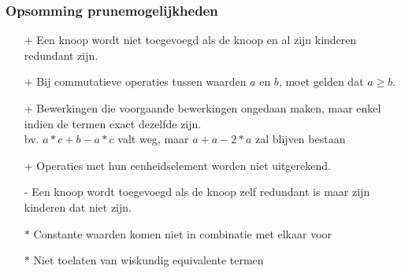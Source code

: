 \documentclass[Main.tex]{subfiles}
\begin{document}
\subsubsection*{Opsomming prunemogelijkheden} \label{ssec:pruningregels}
\begin{itemize}
\item[+] Een knoop wordt niet toegevoegd als de knoop en al zijn kinderen redundant zijn.
\item[+] Bij commutatieve operaties tussen waarden $a$ en $b$, moet gelden dat $a \geq b$.
\item[+] Bewerkingen die voorgaande bewerkingen ongedaan maken, maar enkel indien de termen exact dezelfde zijn.\\
	bv. $a*c+b-a*c$ valt weg, maar $a+a-2*a$ zal blijven bestaan
\item[+] Operaties met hun eenheidselement worden niet uitgerekend.
\item[-] Een knoop wordt toegevoegd als de knoop zelf redundant is maar zijn kinderen dat niet zijn.
\item[$\ast$] Constante waarden komen niet in combinatie met elkaar voor
\item[$\ast$] Niet toelaten van wiskundig equivalente termen
\end{itemize}
\end{document}
